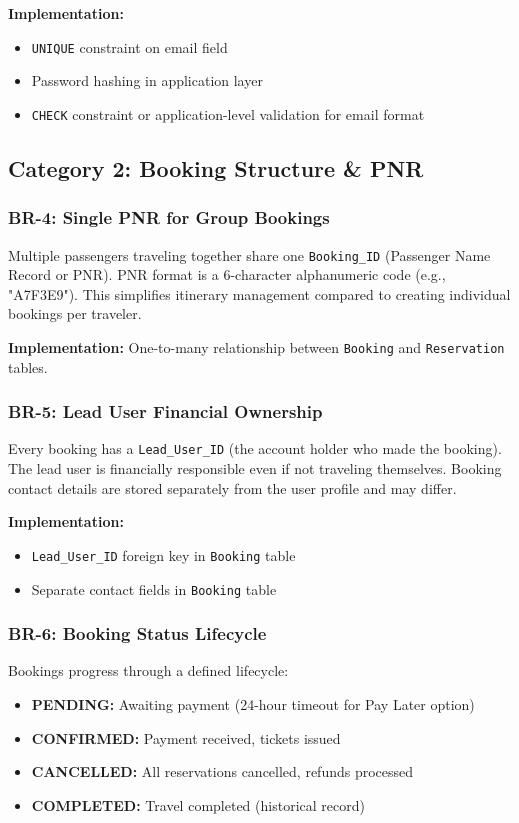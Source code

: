 \documentclass[12pt,a4paper,openany]{report}
\begin{document}
\textbf{Implementation:} 
\begin{itemize}
    \item \texttt{UNIQUE} constraint on email field
    \item Password hashing in application layer
    \item \texttt{CHECK} constraint or application-level validation for email format
\end{itemize}

\subsection{Category 2: Booking Structure \& PNR}

\subsubsection{BR-4: Single PNR for Group Bookings}
Multiple passengers traveling together share one \texttt{Booking\_ID} (Passenger Name Record or PNR). PNR format is a 6-character alphanumeric code (e.g., "A7F3E9"). This simplifies itinerary management compared to creating individual bookings per traveler.

\textbf{Implementation:} One-to-many relationship between \texttt{Booking} and \texttt{Reservation} tables.

\subsubsection{BR-5: Lead User Financial Ownership}
Every booking has a \texttt{Lead\_User\_ID} (the account holder who made the booking). The lead user is financially responsible even if not traveling themselves. Booking contact details are stored separately from the user profile and may differ.

\textbf{Implementation:} 
\begin{itemize}
    \item \texttt{Lead\_User\_ID} foreign key in \texttt{Booking} table
    \item Separate contact fields in \texttt{Booking} table
\end{itemize}

\subsubsection{BR-6: Booking Status Lifecycle}
Bookings progress through a defined lifecycle:
\begin{itemize}
    \item \textbf{PENDING:} Awaiting payment (24-hour timeout for Pay Later option)
    \item \textbf{CONFIRMED:} Payment received, tickets issued
    \item \textbf{CANCELLED:} All reservations cancelled, refunds processed
    \item \textbf{COMPLETED:} Travel completed (historical record)
\end{itemize}
\end{document}
